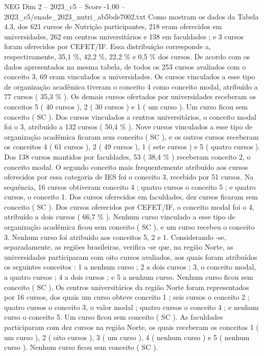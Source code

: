 \begin{textsample}{NEG Dim 2 – 2023\_c5 – Score -1.00 – 2023\_c5/enade\_2023\_nutri\_ab5bde7002.txt}
Como mostram os dados da Tabela 4.3, dos 621 cursos de Nutrição participantes, 218 eram oferecidos em universidades, 262 em centros universitários e 138 em faculdades ; e 3 cursos foram oferecidos por CEFET/IF.
Essa distribuição corresponde a, respectivamente, 35,1 \%, 42,2 \%, 22,2 \% e 0,5 \% dos cursos.
De acordo com os dados apresentados na mesma tabela, de todos os 253 cursos avaliados com o conceito 3, 69 eram vinculados a universidades.
Os cursos vinculados a esse tipo de organização acadêmica tiveram o conceito 4 como conceito modal, atribuído a 77 cursos ( 35,3 \% ).
Os demais cursos ofertados por universidades receberam os conceitos 5 ( 40 cursos ), 2 ( 30 cursos ) e 1 ( um curso ).
Um curso ficou sem conceito ( SC ).
Dos cursos vinculados a centros universitários, o conceito modal foi o 3, atribuído a 132 cursos ( 50,4 \% ).
Nove cursos vinculados a esse tipo de organização acadêmica ficaram sem conceito ( SC ), e os outros cursos receberam os conceitos 4 ( 61 cursos ), 2 ( 49 cursos ), 1 ( sete cursos ) e 5 ( quatro cursos ).
Dos 138 cursos mantidos por faculdades, 53 ( 38,4 \% ) receberam conceito 2, o conceito modal.
O segundo conceito mais frequentemente atribuído aos cursos oferecidos por essa categoria de IES foi o conceito 3, recebido por 51 cursos.
Na sequência, 16 cursos obtiveram conceito 4 ; quatro cursos o conceito 5 ; e quatro cursos, o conceito 1.
Dos cursos oferecidos em faculdades, dez cursos ficaram sem conceito ( SC ).
Dos cursos oferecidos por CEFET/IF, o conceito modal foi o 4, atribuído a dois cursos ( 66,7 \% ).
Nenhum curso vinculado a esse tipo de organização acadêmica ficou sem conceito ( SC ), e um curso recebeu o conceito 3.
Nenhum curso foi atribuído aos conceitos 5, 2 e 1.
Considerando -se, separadamente, as regiões brasileiras, verifica -se que, na região Norte, as universidades participaram com oito cursos avaliados, aos quais foram atribuídos os seguintes conceitos : 1 a nenhum curso ; 2 a dois cursos ; 3, o conceito modal, a quatro cursos ; 4 a dois cursos ; e 5 a nenhum curso.
Nenhum curso ficou sem conceito ( SC ).
Os centros universitários da região Norte foram representados por 16 cursos, dos quais um curso obteve conceito 1 ; seis cursos o conceito 2 ; quatro cursos o conceito 3, o valor modal ; quatro cursos o conceito 4 ; e nenhum curso o conceito 5.
Um curso ficou sem conceito ( SC ).
As faculdades participaram com dez cursos na região Norte, os quais receberam os conceitos 1 ( um curso ), 2 ( oito cursos ), 3 ( um curso ), 4 ( nenhum curso ) e 5 ( nenhum curso ).
Nenhum curso ficou sem conceito ( SC ).

\end{textsample}
